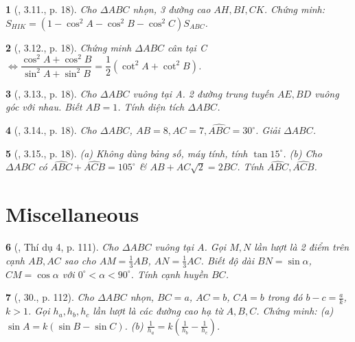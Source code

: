 \documentclass{article}
\newtheorem{baitoan}{}
\begin{document}
\begin{baitoan}[\cite{TLCT_THCS_Toan_9_hinh_hoc}, 3.11., p. 18]
	Cho $\Delta ABC$ nhọn, 3 đường cao $AH,BI,CK$. Chứng minh: $S_{HIK} = (1 - \cos^2A - \cos^2B - \cos^2C)S_{ABC}$.
\end{baitoan}

\begin{baitoan}[\cite{TLCT_THCS_Toan_9_hinh_hoc}, 3.12., p. 18]
	Chứng minh $\Delta ABC$ cân tại C $\Leftrightarrow\dfrac{\cos^2A + \cos^2B}{\sin^2A + \sin^2B} = \dfrac{1}{2}(\cot^2A + \cot^2B)$.
\end{baitoan}

\begin{baitoan}[\cite{TLCT_THCS_Toan_9_hinh_hoc}, 3.13., p. 18]
	Cho $\Delta ABC$ vuông tại A. 2 đường trung tuyến $AE,BD$ vuông góc với nhau. Biết $AB = 1$. Tính diện tích $\Delta ABC$.
\end{baitoan}

\begin{baitoan}[\cite{TLCT_THCS_Toan_9_hinh_hoc}, 3.14., p. 18]
	Cho $\Delta ABC$, $AB = 8,AC = 7,\widehat{ABC} = 30^\circ$. Giải $\Delta ABC$.
\end{baitoan}

\begin{baitoan}[\cite{TLCT_THCS_Toan_9_hinh_hoc}, 3.15., p. 18]
	(a) Không dùng bảng số, máy tính, tính $\tan15^\circ$. (b) Cho $\Delta ABC$ có $\widehat{ABC} + \widehat{ACB} = 105^\circ$ \& $AB + AC\sqrt{2} = 2BC$. Tính $\widehat{ABC},\widehat{ACB}$.
\end{baitoan}


\section{Miscellaneous}

\begin{baitoan}[\cite{Tuyen_Toan_9_old}, Thí dụ 4, p. 111]
	Cho $\Delta ABC$ vuông tại $A$. Gọi $M,N$ lần lượt là 2 điểm trên cạnh $AB,AC$ sao cho $AM = \frac{1}{3}AB$, $AN = \frac{1}{3}AC$. Biết độ dài $BN = \sin\alpha$, $CM = \cos\alpha$ với $0^\circ < \alpha < 90^\circ$. Tính cạnh huyền $BC$.
\end{baitoan}

\begin{baitoan}[\cite{Tuyen_Toan_9_old}, 30., p. 112]
	Cho $\Delta ABC$ nhọn, $BC = a$, $AC = b$, $CA = b$ trong đó $b - c = \frac{a}{k}$, $k > 1$. Gọi $h_a,h_b,h_c$ lần lượt là các đường cao hạ từ $A,B,C$. Chứng minh: (a) $\sin A = k(\sin B - \sin C)$. (b) $\frac{1}{h_a} = k\left(\frac{1}{h_b} - \frac{1}{h_c}\right)$.
\end{baitoan}
\end{document}
